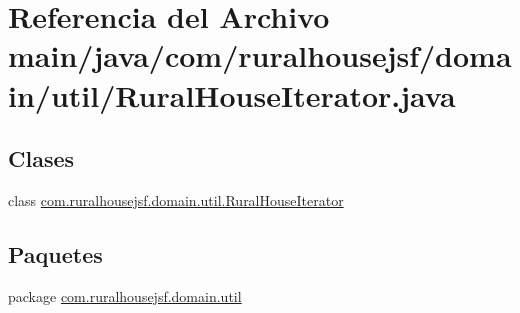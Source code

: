 \hypertarget{a00056}{}\section{Referencia del Archivo main/java/com/ruralhousejsf/domain/util/\+Rural\+House\+Iterator.java}
\label{a00056}
\subsection*{Clases}
\begin{DoxyCompactItemize}
\item 
class \mbox{\hyperlink{a00200}{com.\+ruralhousejsf.\+domain.\+util.\+Rural\+House\+Iterator}}
\end{DoxyCompactItemize}
\subsection*{Paquetes}
\begin{DoxyCompactItemize}
\item 
package \mbox{\hyperlink{a00117}{com.\+ruralhousejsf.\+domain.\+util}}
\end{DoxyCompactItemize}
